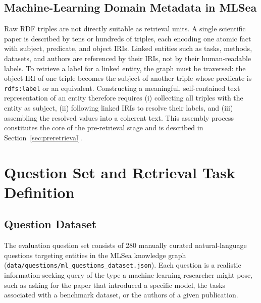 \subsection{Machine-Learning Domain Metadata in MLSea}
\label{subsec:mlsea_metadata}

Raw RDF triples are not directly suitable as retrieval units.
A single scientific paper is described by tens or hundreds of triples, each
encoding one atomic fact with subject, predicate, and object IRIs.
Linked entities such as tasks, methods, datasets, and authors are referenced
by their IRIs, not by their human-readable labels.
To retrieve a label for a linked entity, the graph must be traversed: the
object IRI of one triple becomes the subject of another triple whose predicate
is \texttt{rdfs:label} or an equivalent.
Constructing a meaningful, self-contained text representation of an entity
therefore requires (i) collecting all triples with the entity as subject,
(ii) following linked IRIs to resolve their labels, and (iii) assembling the
resolved values into a coherent text.
This assembly process constitutes the core of the pre-retrieval stage and is
described in Section~\ref{sec:preretrieval}.

\section{Question Set and Retrieval Task Definition}
\label{sec:questions}

\subsection{Question Dataset}
\label{subsec:question_dataset}

The evaluation question set consists of 280 manually curated natural-language
questions targeting entities in the MLSea knowledge graph
(\texttt{data/questions/ml\_questions\_dataset.json}).
Each question is a realistic information-seeking query of the type a
machine-learning researcher might pose, such as asking for the paper that
introduced a specific model, the tasks associated with a benchmark dataset,
or the authors of a given publication.

